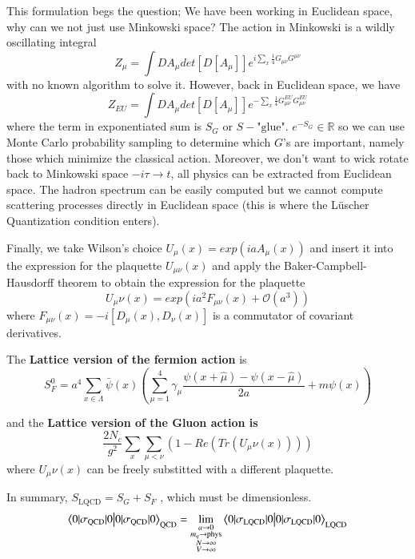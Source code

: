 This formulation begs the question; We have been working in Euclidean space, why can we not just use Minkowski space? The action in Minkowski is a wildly oscillating integral 
\begin{equation}
    Z_\mu = \int DA_\mu det\left[D[A_\mu]\right] e^{i \sum_{x}^{}\frac{1}{4}G_{\mu\nu}G^{\mu\nu}}
\end{equation}
with no known algorithm to solve it. However, back in Euclidean space, we have 
\begin{equation}
    Z_{EU} = \int DA_\mu det\left[D[A_\mu]\right] e^{- \sum_{x}^{}\frac{1}{4}G_{\mu\nu}^{EU}G_{\mu\nu}^{EU}}
\end{equation} where the term in exponentiated sum is $S_G$ or $S - \text{"glue"}$. $e^{-S_G} \in \mathbb{R}$ so we can use Monte Carlo probability sampling to determine which $G$'s are important, namely those which minimize the classical action. Moreover, we don't want to wick rotate back to Minkowski space $-i\tau \to t$, all physics can be extracted from Euclidean space. The hadron spectrum can be easily computed but we cannot compute scattering processes directly in Euclidean space (this is where the L\"{u}scher Quantization condition enters). 

Finally, we take Wilson's choice $U_\mu(x) = exp\left(iaA_\mu(x)\right)$ and insert it into the expression for the plaquette $U_{\mu\nu}(x)$ and apply the Baker-Campbell-Hausdorff theorem\cite{Hall2004LieGL} to obtain the expression for the plaquette 
\begin{equation}
    U_\mu\nu(x) = exp\left(ia^2F_{\mu\nu}(x) + \mathcal{O}(a^3) \right)
\end{equation} where $F_{\mu\nu}(x) = -i\left[D_\mu(x),D_\nu(x)\right]$ is a commutator of covariant derivatives. 

The \textbf{Lattice version of the fermion action} is
\begin{equation}
    S_F^0 = a^4 \sum_{x\in\Lambda}^{} \bar{\psi}(x)\left(\sum_{\mu=1}^{4} \gamma_\mu \frac{\psi(x+\hat{\mu}) -\psi(x-\hat{\mu}) }{2a} + m\psi(x)\right)
\end{equation}

and the \textbf{Lattice version of the Gluon action is} 
\begin{equation}
    \frac{2N_c}{g^2} \sum_{x}^{} \sum_{\mu<\nu}^{} \left(1 - Re(Tr(U_\mu\nu(x)))\right)
\end{equation}
where $U_\mu\nu(x)$ can be freely substitted with a different plaquette. 

In summary, $S_{\text{LQCD}} = S_G + S_F$ , which must be dimensionless. 
\begin{equation}
    \braket{0|\sigma_{\text{QCD}}|0}_{\text{QCD}} = \lim_{\substack{a\to 0 \\ m_q \to \text{phys} \\ N\to\infty \\ V \to \infty}} \braket{0|\sigma_{\text{LQCD}}|0}_{\text{LQCD}}
\end{equation}

